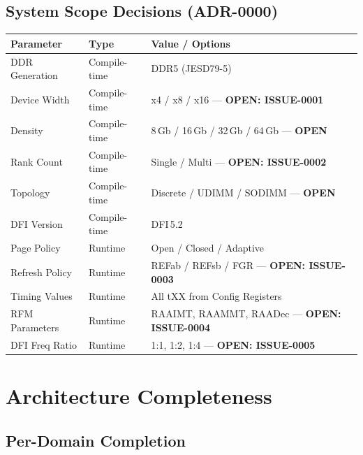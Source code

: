 \documentclass[10pt,a4paper]{article}
\newcommand{\Th}[1]{\cellcolor{thbg}\textbf{\small\color{acc1}#1}}
\newcommand{\RA}{\rowcolor{white}}
\newcommand{\RB}{\rowcolor{altbg}}
\begin{document}
\subsection{System Scope Decisions (ADR-0000)}

\begin{center}
\begin{tabularx}{\linewidth}{@{} l l X @{}}
\toprule
\Th{Parameter} & \Th{Type} & \Th{Value / Options} \\
\midrule
\RA DDR Generation   & Compile-time & DDR5 (JESD79-5) \\
\RB Device Width     & Compile-time & x4 / x8 / x16 --- \textcolor{acc2}{\textbf{OPEN: ISSUE-0001}} \\
\RA Density          & Compile-time & 8\,Gb / 16\,Gb / 32\,Gb / 64\,Gb --- \textcolor{acc2}{\textbf{OPEN}} \\
\RB Rank Count       & Compile-time & Single / Multi --- \textcolor{acc2}{\textbf{OPEN: ISSUE-0002}} \\
\RA Topology         & Compile-time & Discrete / UDIMM / SODIMM --- \textcolor{acc2}{\textbf{OPEN}} \\
\RB DFI Version      & Compile-time & DFI\,5.2 \\
\RA Page Policy      & Runtime      & Open / Closed / Adaptive \\
\RB Refresh Policy   & Runtime      & REFab / REFsb / FGR --- \textcolor{acc2}{\textbf{OPEN: ISSUE-0003}} \\
\RA Timing Values    & Runtime      & All tXX from Config Registers \\
\RB RFM Parameters   & Runtime      & RAAIMT, RAAMMT, RAADec --- \textcolor{acc2}{\textbf{OPEN: ISSUE-0004}} \\
\RA DFI Freq Ratio   & Runtime      & 1:1, 1:2, 1:4 --- \textcolor{acc2}{\textbf{OPEN: ISSUE-0005}} \\
\bottomrule
\end{tabularx}
\end{center}

\section{Architecture Completeness}

\subsection{Per-Domain Completion}
\end{document}
